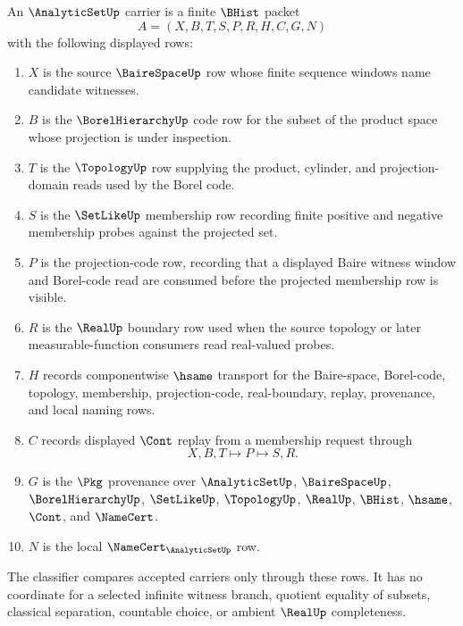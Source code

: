 \begin{definition}
\label{def:analytic-set-carrier}
An $\AnalyticSetUp$ carrier is a finite $\BHist$ packet
$$
A=(X,B,T,S,P,R,H,C,G,N)
$$
with the following displayed rows:
\begin{enumerate}
\item $X$ is the source $\BaireSpaceUp$ row whose finite sequence windows name candidate witnesses.
\item $B$ is the $\BorelHierarchyUp$ code row for the subset of the product space whose projection is under inspection.
\item $T$ is the $\TopologyUp$ row supplying the product, cylinder, and projection-domain reads used by the Borel code.
\item $S$ is the $\SetLikeUp$ membership row recording finite positive and negative membership probes against the projected set.
\item $P$ is the projection-code row, recording that a displayed Baire witness window and Borel-code read are consumed before the projected membership row is visible.
\item $R$ is the $\RealUp$ boundary row used when the source topology or later measurable-function consumers read real-valued probes.
\item $H$ records componentwise $\hsame$ transport for the Baire-space, Borel-code, topology, membership, projection-code, real-boundary, replay, provenance, and local naming rows.
\item $C$ records displayed $\Cont$ replay from a membership request through
$$
X,B,T \longmapsto P \longmapsto S,R .
$$
\item $G$ is the $\Pkg$ provenance over $\AnalyticSetUp$, $\BaireSpaceUp$, $\BorelHierarchyUp$, $\SetLikeUp$, $\TopologyUp$, $\RealUp$, $\BHist$, $\hsame$, $\Cont$, and $\NameCert$.
\item $N$ is the local $\NameCert_{\AnalyticSetUp}$ row.
\end{enumerate}
The classifier compares accepted carriers only through these rows. It has no coordinate for a selected infinite witness branch, quotient equality of subsets, classical separation, countable choice, or ambient $\RealUp$ completeness.
\end{definition}

